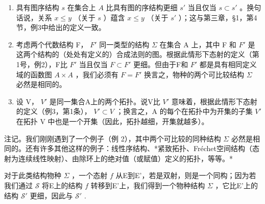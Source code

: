 \begin{enumerate}
\def\labelenumi{(\arabic{enumi})}
\item
  具有图序结构 \(s\) 在集合上 \(A\) 比具有图的序结构更细 \(s'\) 当且仅当 \(s \subset s'\) 。换句话说，关系 \(x \leqslant y\) （关于 \(s\) ）蕴含 \(x \leqslant y\) （关于 \(s'\) ）；这与第三章，§1，第4节，例3中给出的定义一致。
\item
  考虑两个代数结构 F， \(F'\) 同一类型的结构 \(\Sigma\) 在集合 A 上，其中 F 和 \(F'\) 是这两个结构的（处处有定义的）合成法则的图。根据此情形下态射的定义（第1号，例2），F比 \(F'\) 当且仅当 \(F \subset F'\) 更细。但由于F和 \(F'\) 都是具有相同定义域的函数图 \(A \times A\) ，我们必须有 \(F = F'\) 换言之，物种的两个可比较结构 \(\Sigma\) 必然是相同的。
\item
  设 V， \(V'\) 是同一集合A上的两个拓扑。说V比 \(V'\) 意味着，根据此情形下态射的定义（例3，第1条）， \(V' \subset V\) ；换言之，A 的每个在拓扑中为开集的子集 \(V'\) 在拓扑 V 中也是一个开集（因此，拓扑越细，开集就越多）。
\end{enumerate}

注记。我们刚刚遇到了一个例子（例 2），其中两个可比较的同种结构 \(\Sigma\) 必然是相同的。还有许多其他这样的例子：线性序结构、*紧致拓扑、Fréchet空间结构（态射为连续线性映射）、由除环上的绝对值（或赋值）定义的拓扑，等等。*

对于此类结构物种 \(\Sigma\) ，一个态射 \(f\) 从E到E'，若是双射，则是一个同构；因为若我们通过 \(\mathcal{S}\) 将E上的结构 \(f\) 转移到E'上，我们得到一个物种结构 \(\Sigma\) ，它比E'上的结构 \(\mathcal{S}'\) 更细，因此与 \(\mathcal{S}'\) .

